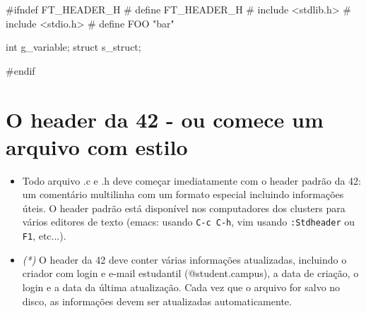 \documentclass{42-pt}
\begin{document}
\vspace{1cm}

      \begin{42ccode}
#ifndef FT_HEADER_H
# define FT_HEADER_H
# include <stdlib.h>
# include <stdio.h>
# define FOO "bar"

int     g_variable;
struct  s_struct;

#endif
        \end{42ccode}
        \newpage


  \section{O header da 42 - ou comece um arquivo com estilo}

    \begin{itemize}

    \item Todo arquivo .c e .h deve começar imediatamente com o header padrão da 42:
      um comentário multilinha com um formato especial incluindo informações úteis. O
      header padrão está disponível nos computadores dos clusters para vários
      editores de texto (emacs: usando \texttt{C-c C-h}, vim usando \texttt{:Stdheader} ou
      \texttt{F1}, etc...).

    \item \textit{(*)} O header da 42 deve conter várias informações atualizadas, incluindo o
      criador com login e e-mail estudantil (@student.campus), a data de criação,
      o login e a data da última atualização. Cada vez que o arquivo for salvo no disco,
      as informações devem ser atualizadas automaticamente.

    \end{itemize}
    
    \newpage     
                
\end{document}
